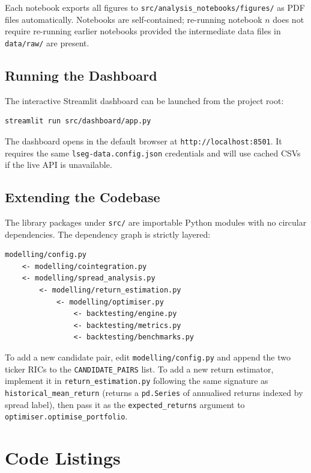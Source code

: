 \documentclass[a4paper]{report}
\begin{document}
Each notebook exports all figures to \texttt{src/analysis\_notebooks/figures/} as PDF files automatically.  Notebooks are self-contained; re-running notebook $n$ does not require re-running earlier notebooks provided the intermediate data files in \texttt{data/raw/} are present.

\subsection{Running the Dashboard}

The interactive Streamlit dashboard can be launched from the project root:

\begin{Verbatim}[fontsize=\small, baselinestretch=0.9]
streamlit run src/dashboard/app.py
\end{Verbatim}

The dashboard opens in the default browser at \texttt{http://localhost:8501}.  It requires the same \texttt{lseg-data.config.json} credentials and will use cached CSVs if the live API is unavailable.

\subsection{Extending the Codebase}

The library packages under \texttt{src/} are importable Python modules with no circular dependencies.  The dependency graph is strictly layered:

\begin{Verbatim}[fontsize=\small, baselinestretch=0.9]
modelling/config.py
    <- modelling/cointegration.py
    <- modelling/spread_analysis.py
        <- modelling/return_estimation.py
            <- modelling/optimiser.py
                <- backtesting/engine.py
                <- backtesting/metrics.py
                <- backtesting/benchmarks.py
\end{Verbatim}

To add a new candidate pair, edit \texttt{modelling/config.py} and append the two ticker RICs to the \texttt{CANDIDATE\_PAIRS} list.  To add a new return estimator, implement it in \texttt{return\_estimation.py} following the same signature as \texttt{historical\_mean\_return} (returns a \texttt{pd.Series} of annualised returns indexed by spread label), then pass it as the \texttt{expected\_returns} argument to \texttt{optimiser.optimise\_portfolio}.


\section{Code Listings}
\end{document}

